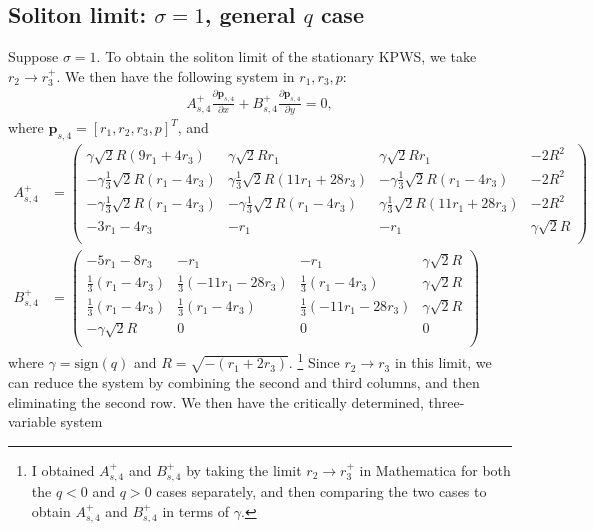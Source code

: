 \documentclass[12pt]{article}
\numberwithin{equation}{section}
\begin{document}
\subsection{Soliton limit: $\sigma = 1$, general $q$  case } \label{sec:soliton sig = 1}
Suppose $\sigma = 1$. To obtain the soliton limit of the stationary KPWS, we take $r_2 \to r_3^+$. We then have the following system in $r_1,r_3,p$:
\begin{align}
    A_{s,4}^+\frac{\partial \textbf{p}_{s,4}}{\partial x} + B_{s,4}^+\frac{\partial \textbf{p}_{s,4}}{\partial y} =0, \label{vector eq for statKPWS}
\end{align}
where $\textbf{p}_{s,4} = [r_1,r_2,r_3,p]^T$, and 
\begin{subequations}
    \begin{align*}
        A_{s,4}^+ &= \left(
\begin{array}{cccc}
 \gamma\sqrt{2} R (9 r_1+4 r_3) & \gamma\sqrt{2} R r_1 & \gamma\sqrt{2} R r_1 & -2 R^2 \\
 -\gamma\frac{1}{3} \sqrt{2} R (r_1-4 r_3) & \gamma\frac{1}{3} \sqrt{2} R (11 r_1+28 r_3) & -\gamma\frac{1}{3} \sqrt{2} R (r_1-4
   r_3) & -2 R^2 \\
 -\gamma\frac{1}{3} \sqrt{2} R (r_1-4 r_3) & -\gamma\frac{1}{3} \sqrt{2} R (r_1-4 r_3) & \gamma\frac{1}{3} \sqrt{2} R (11 r_1+28
   r_3) & -2 R^2 \\
 -3 r_1-4 r_3 & -r_1 & -r_1 & \gamma\sqrt{2} R \\
\end{array}
\right)
\\
B_{s,4}^+ &= \left(
\begin{array}{cccc}
 -5 r_1-8 r_3 & -r_1 & -r_1 & \gamma\sqrt{2} R \\
 \frac{1}{3} (r_1-4 r_3) & \frac{1}{3} (-11 r_1-28 r_3) & \frac{1}{3} (r_1-4 r_3) & \gamma\sqrt{2} R \\
 \frac{1}{3} (r_1-4 r_3) & \frac{1}{3} (r_1-4 r_3) & \frac{1}{3} (-11 r_1-28 r_3) & \gamma\sqrt{2} R \\
 -\gamma\sqrt{2} R & 0 & 0 & 0 \\
\end{array}
\right)
\end{align*}
\end{subequations}
where $\gamma = \text{sign}(q)$ and $R = \sqrt{-(r_1 + 2r_3)}$. \footnote{I obtained $A_{s,4}^+$ and $B_{s,4}^+$ by taking the limit $r_2 \to r_3^+$ in Mathematica for both the $q<0$ and $q>0$ cases separately, and then comparing the two cases to obtain $A_{s,4}^+$ and $B_{s,4}^+$ in terms of $\gamma$. } Since $r_2 \to r_3$ in this limit, we can reduce the system by combining the second and third columns, and then eliminating the second row. We then have the critically determined, three-variable system
\end{document}
